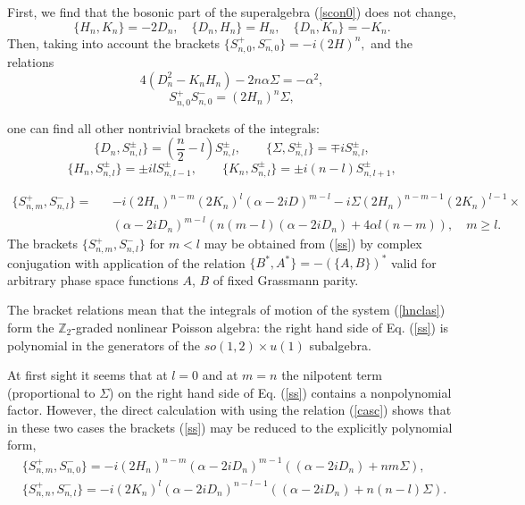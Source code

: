 \documentclass[a4paper,12pt]{article}
\def\Z{\mathbb Z}
\begin{document}
First, we find that the bosonic part of the superalgebra
(\ref{scon0}) does not change,
\begin{equation}
\{H_n,K_n\}=-2D_n,\quad
\{D_n,H_n\}=H_n,\quad
\{D_n,K_n\}=-K_n.
\label{soclas}
\end{equation}
Then, taking into account the brackets
$
\{S^+_{n,0},S^-_{n,0}\}=-i(2H)^n,
$
and the relations
\begin{equation}
4(D_n^2-K_nH_n)-2n\alpha\Sigma=
-\alpha^2,
\label{casc}
\end{equation}
\begin{equation}
S^+_{n,0}S^-_{n,0}=(2H_n)^n\Sigma,
\label{ssh}
\end{equation}

one can find all other nontrivial brackets
of the integrals:
\begin{equation}
\{D_n,S^\pm_{n,l}\}=\left(\frac{n}{2}-l\right)
S^\pm_{n,l},\qquad
\{\Sigma,S^\pm_{n,l}\}=\mp iS^\pm_{n,l},
\label{dsig}
\end{equation}
\begin{equation}
\{H_n,S^\pm_{n,l}\}=\pm ilS^\pm_{n,l-1},\qquad
\{K_n,S^\pm_{n,l} \}=\pm i(n-l)S^\pm_{n,l+1},
\label{hkss}
\end{equation}


\begin{eqnarray}
\{S^+_{n,m},S^-_{n,l}\}=
&&-i(2H_n)^{n-m}(2K_n)^l(\alpha -2iD)^{m-l}
-i\Sigma(2H_n)^{n-m-1}(2K_n)^{l-1}\times
\nonumber\\
&&(\alpha -2iD_n)^{m-l}\left(n(m-l)(\alpha -2i D_n)+4\alpha
l(n-m)
\right),\quad
m\geq l.
\label{ss}
\end{eqnarray}
The brackets $\{S^+_{n,m},S^-_{n,l}\}$
for $m< l$ may be obtained
from (\ref{ss}) by complex conjugation
with application of  the relation
$\{B^*,A^*\}=-(\{A,B\})^*$
valid for arbitrary phase space functions $A$, $B$ of
fixed Grassmann parity.

The bracket relations mean that the
integrals of motion of the system (\ref{hnclas})
form the $\Z_2$-graded
nonlinear Poisson algebra:
the right hand side of Eq. (\ref{ss}) is polynomial in
the generators of the $so(1,2)\times u(1)$ subalgebra.

At first sight it seems that
at $l=0$ and at $m=n$
the nilpotent term (proportional to $\Sigma$)
on the right hand side of Eq. (\ref{ss})
contains a nonpolynomial factor.
However, the direct calculation with
using the relation (\ref{casc})
shows that in these two cases the brackets
(\ref{ss})
may be reduced to
the explicitly polynomial form,
\begin{eqnarray}
&\{S^+_{n,m},S^-_{n,0}\}=-i(2H_n)^{n-m}
(\alpha-2iD_n)^{m-1}
\left((\alpha -2iD_n)
+nm\Sigma\right),&\label{ss1}\\
&
\{S^+_{n,n},S^-_{n,l}\}=
-i(2K_n)^l(\alpha-2iD_n)^{n-l-1}\left(
(\alpha-2iD_n)+n(n-l)\Sigma\right).
&
\label{ss2}
\end{eqnarray}
\end{document}
